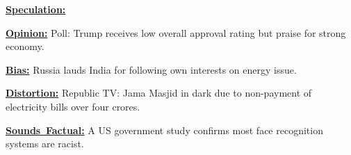 \vspace{-7mm}
\begin{tcolorbox}[enhanced,attach boxed title to top right={yshift=-3mm,yshifttext=-1mm},
  colback=blue!5!white,colframe=blue!75!black,colbacktitle=red!80!black,
  title=$1^{st}$ level: type of omission,fonttitle=\bfseries,
  boxed title style={size=small,colframe=red!50!black},left=0pt, right=0pt]

  \begin{spacing}{0.8}
  \textbf{\ul{\footnotesize Speculation:}} {\fontsize{8}{10}\selectfont{Biden warned the US does not have 'resources to win WW3' as tensions rise in the Middle East.}}
  \end{spacing}

  \vspace{-2.5mm}
  \DrawLine
  
  \begin{spacing}{0.8}
  \textbf{\ul{\footnotesize Opinion:} }{\fontsize{8}{10}\selectfont
 Poll: Trump receives low overall approval rating but praise for strong economy.}\end{spacing}
  \vspace{-2.5mm}
  \DrawLine
  \begin{spacing}{0.8}
  \textbf{\ul{\footnotesize Bias:} }{
  \fontsize{8}{10}\selectfont
  Russia lauds India for following own interests on energy issue.}
  \end{spacing} 

  \vspace{-2.5mm}
  \DrawLine
  
  \begin{spacing}{0.8}
  \textbf{\ul{\footnotesize Distortion:} }{\fontsize{8}{10}\selectfont
  Republic TV: Jama Masjid in dark due to non-payment of electricity bills over four crores.}
  \end{spacing}

  \vspace{-2.5mm}
  \DrawLine
  
  \begin{spacing}{0.8}
  \textbf{\ul{\footnotesize Sounds\, Factual:} }{\fontsize{8}{10}\selectfont
  A US government study confirms most face recognition systems are racist.}\end{spacing} 
  \vspace{-0.75mm}
\end{tcolorbox}



